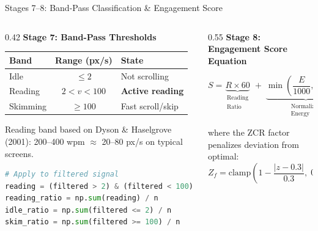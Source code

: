 \documentclass[aspectratio=169,10pt]{beamer}
\begin{document}
\begin{frame}{Stages 7--8: Band-Pass Classification \& Engagement Score}
\begin{columns}[T]
\begin{column}{0.42\textwidth}
\textbf{Stage 7: Band-Pass Thresholds}

\vspace{4pt}
\footnotesize
\begin{tabular}{@{}lcl@{}}
\toprule
\textbf{Band} & \textbf{Range (px/s)} & \textbf{State} \\
\midrule
Idle & $\leq 2$ & Not scrolling \\
\rowcolor{cpugreen!15}
Reading & $2 < v < 100$ & \textbf{Active reading} \\
Skimming & $\geq 100$ & Fast scroll/skip \\
\bottomrule
\end{tabular}

\vspace{4pt}
\scriptsize Reading band based on Dyson \& Haselgrove (2001): 200--400 wpm $\approx$ 20--80 px/s on typical screens.

\vspace{6pt}
\begin{lstlisting}[language=Python]
# Apply to filtered signal
reading = (filtered > 2) & (filtered < 100)
reading_ratio = np.sum(reading) / n
idle_ratio = np.sum(filtered <= 2) / n
skim_ratio = np.sum(filtered >= 100) / n
\end{lstlisting}
\end{column}

\begin{column}{0.55\textwidth}
\textbf{Stage 8: Engagement Score Equation}

\vspace{4pt}
\begin{equation*}
\boxed{
S = \underbrace{R \times 60}_{\substack{\text{Reading}\\\text{Ratio}}} \;+\; \underbrace{\min\!\left(\frac{E}{1000},\,1\right) \times 25}_{\substack{\text{Normalized}\\\text{Energy}}} \;+\; \underbrace{Z_f \times 15}_{\substack{\text{ZCR}\\\text{Factor}}}
}
\end{equation*}

\vspace{4pt}
\footnotesize
where the ZCR factor penalizes deviation from optimal:
\begin{equation*}
Z_f = \text{clamp}\!\left(1 - \frac{|z - 0.3|}{0.3},\; 0,\; 1\right)
\end{equation*}


\end{column}
\end{columns}
\end{frame}
\end{document}
